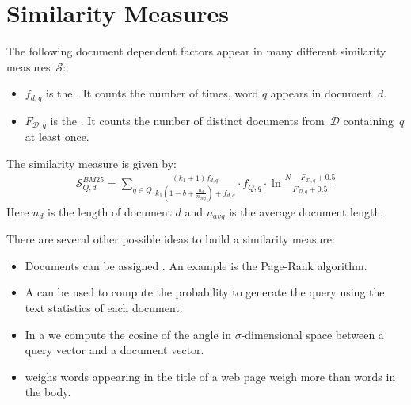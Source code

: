 \section{Similarity Measures}

\begin{Definition}
  The following document dependent factors appear in many different similarity measures~$\mathcal{S}$:
  \begin{itemize}
    \item $f_{d,q}$ is the . It counts the number of times, word $q$ appears in document~$d$.
    \item $F_{\mathcal{D},q}$ is the . It counts the number of distinct documents from~$\mathcal{D}$ containing~$q$ at least once.
  \end{itemize}
\end{Definition}

\begin{Definition}
  The  similarity measure is given by:
  \begin{align}
    \mathcal{S}_{Q,d}^{BM25} = \sum\limits_{q \in Q}
    \frac{\left(k_1 + 1\right)f_{d,q}}{k_1\left(1 - b + \frac{n_d}{n_{avg}}\right) + f_{d,q}}
    \cdot f_{Q,q} \cdot
    \ln\frac{N - F_{\mathcal{D},q} + 0.5}{F_{\mathcal{D},q} + 0.5}
  \end{align}
  Here $n_d$ is the length of document $d$ and $n_{avg}$ is the average document length.
\end{Definition}

There are several other possible ideas to build a similarity measure:
\begin{itemize}
  \item Documents can be assigned . An example is the Page-Rank algorithm.
  \item A  can be used to compute the probability to generate the query using the text statistics of each document.
  \item In a  we compute the cosine of the angle in $\sigma$-dimensional space between a query vector and a document vector.
  \item {} weighs words appearing in the title of a web page weigh more than words in the body.
\end{itemize}
